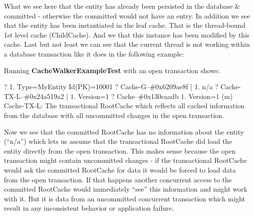 What we see here that the entity has already been persisted in the database \& committed - otherwise the committed  would not have an entry. In addition we see that the entity has been instantiated in the leaf cache. That is the thread-bound 1st level cache (ChildCache). And we that this instance has been modified by this cache. Last but not least we can see that the current thread is not working within a database transaction like it does in the following example:\newline

Running \textbf{CacheWalkerExampleTest} with an open transaction shows:

{
? 1. Type=MyEntity Id(PK)=10001
	? Cache-G--\#0x6209ae8f
		|  1. n/a
		? Cache-TX-L--\#0x24a519a2
			|  1. Version=1
			? Cache--\#0x130caadb
				   1. Version=1 (m)
}
Cache-TX-L: The transactional RootCache which reflects all cached information from the database with all uncommitted changes in the open transaction.\newline

Now we see that the committed RootCache has no information about the entity (``n/a'') which lets us assume that the transactional RootCache did load the entity directly from the open transaction. This makes sense because the open transaction might contain uncommitted changes - if the transactional RootCache would ask the committed RootCache for data it would be forced to load data from the open transaction. If that happens another concurrent access to the committed RootCache would immediately ``see'' this information and might work with it. But it is data from an uncommitted concurrent transaction which might result in any inconsistent behavior or application failure.